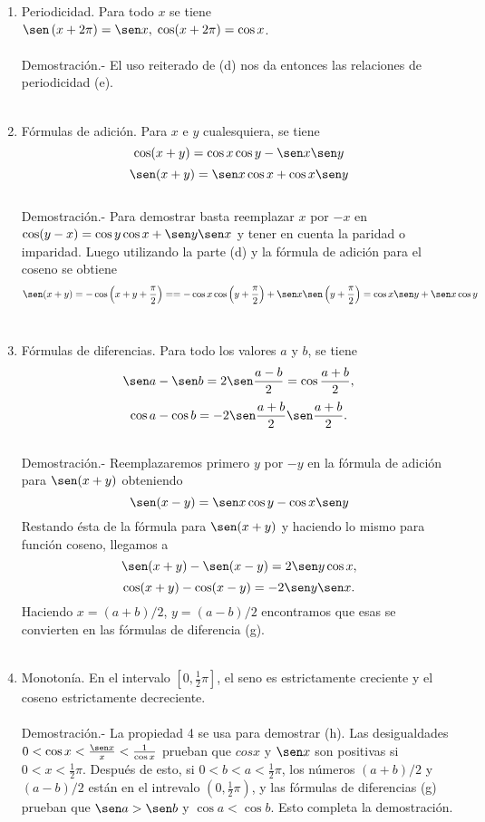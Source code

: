\begin{teo}
\begin{enumerate}[\bfseries (a)]
	\item Periodicidad. Para todo $x$ se tiene $\sen\left(x+2\pi \right) = \sen x, \; \cos(x+2\pi) = \cos x$.\\\\
	    Demostración.-\; El uso reiterado de (d) nos da entonces las relaciones de periodicidad (e).\\\\
	
	\item Fórmulas de adición. Para $x$ e $y$ cualesquiera, se tiene 
	    $$\cos (x+y) = \cos x \cos y - \sen x \sen y$$
	    $$\sen (x+y) = \sen x \cos x + \cos x \sen y$$\\
	    Demostración.-\; Para demostrar basta reemplazar $x$ por $-x$ en  $\cos(y-x) = \cos y \cos x + \sen y \sen x$ y tener en cuenta la paridad o imparidad. Luego utilizando la parte (d) y la fórmula de adición para el coseno se obtiene $$\sen(x+y) = -\cos \left(x+y+\frac{\pi}{2}\right) = =-\cos x \cos \left(y+\dfrac{\pi}{2}\right) + \sen x \sen \left(y + \dfrac{\pi}{2}\right) = \cos x\sen y + \sen x \cos y$$ \\

	\item  Fórmulas de diferencias. Para todo los valores $a$ y $b$, se tiene 
	    $$\sen a - \sen b = 2\sen \dfrac{a-b}{2} = \cos \dfrac{a+b}{2},$$
	    $$\cos a - \cos b = -2 \sen \dfrac{a+b}{2} \sen \dfrac{a+b}{2}.$$\\
	    Demostración.-\; Reemplazaremos primero $y$ por $-y$ en la fórmula de adición para $\sen(x+y)$ obteniendo $$\sen(x-y)=\sen x \cos y - \cos x \sen y$$
	    Restando ésta de la fórmula para $\sen(x+y)$ y haciendo lo mismo para función coseno, llegamos a
	    $$\sen(x+y) -\sen(x-y) =  2\sen y \cos x,$$
	    $$\cos(x+y) - \cos(x-y) = -2\sen y \sen x.$$
	    Haciendo $x=(a+b)/2$,  $y=(a-b)/2$ encontramos que esas se convierten en las fórmulas de diferencia (g).\\\\

	\item Monotonía. En el intervalo $[0,\frac{1}{2}\pi]$, el seno es estrictamente creciente y el coseno estrictamente decreciente.\\\\
	    Demostración.-\; La propiedad 4 se usa para demostrar (h). Las desigualdades $0<\cos x < \frac{\sen x}{x}<\frac{1}{\cos x}$ prueban que $cos x$ y $\sen x$ son positivas si $0<x<\frac{1}{2}\pi$. Después de esto, si $0<b<a<\frac{1}{2}\pi$, los números $(a+b)/2$ y $(a-b)/2$ están en el intrevalo $(0,\frac{1}{2}\pi)$, y las fórmulas de diferencias (g) prueban que $\sen a > \sen b$ y $\cos a < \cos b$. Esto completa la demostración.\\\\

    \end{enumerate}
\end{teo}


